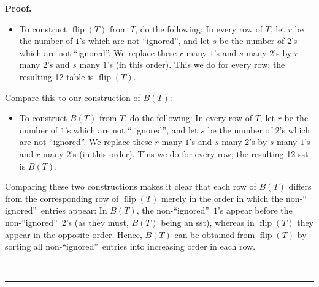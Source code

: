 \documentclass[numbers=enddot,12pt,final,onecolumn,notitlepage]{scrartcl}%
\theoremstyle{definition}
\newenvironment{proof}[1][Proof]{\noindent\textbf{#1.} }{\ \rule{0.5em}{0.5em}}
\begin{document}
\begin{proof}
\begin{itemize}
\item To construct $\operatorname*{flip}\left(  T\right)  $ from $T$, do the
following: In every row of $T$, let $r$ be the number of $1$'s which are not
\textquotedblleft ignored\textquotedblright, and let $s$ be the number of
$2$'s which are not \textquotedblleft ignored\textquotedblright. We replace
these $r$ many $1$'s and $s$ many $2$'s by $r$ many $2$'s and $s$ many $1$'s
(in this order). This we do for every row; the resulting 12-table is
$\operatorname*{flip}\left(  T\right)  $.
\end{itemize}

Compare this to our construction of $B\left(  T\right)  $:

\begin{itemize}
\item To construct $B\left(  T\right)  $ from $T$, do the following: In every
row of $T$, let $r$ be the number of $1$'s which are not \textquotedblleft
ignored\textquotedblright, and let $s$ be the number of $2$'s which are not
\textquotedblleft ignored\textquotedblright. We replace these $r$ many $1$'s
and $s$ many $2$'s by $s$ many $1$'s and $r$ many $2$'s (in this order). This
we do for every row; the resulting 12-sst is $B\left(  T\right)  $.
\end{itemize}

Comparing these two constructions makes it clear that each row of $B\left(
T\right)  $ differs from the corresponding row of $\operatorname*{flip}\left(
T\right)  $ merely in the order in which the non-\textquotedblleft
ignored\textquotedblright\ entries appear: In $B\left(  T\right)  $, the
non-\textquotedblleft ignored\textquotedblright\ $1$'s appear before the
non-\textquotedblleft ignored\textquotedblright\ $2$'s (as they must,
$B\left(  T\right)  $ being an sst), whereas in $\operatorname*{flip}\left(
T\right)  $ they appear in the opposite order. Hence, $B\left(  T\right)  $
can be obtained from $\operatorname*{flip}\left(  T\right)  $ by sorting all
non-\textquotedblleft ignored\textquotedblright\ entries into increasing order
in each row.


\end{proof}
\end{document}
